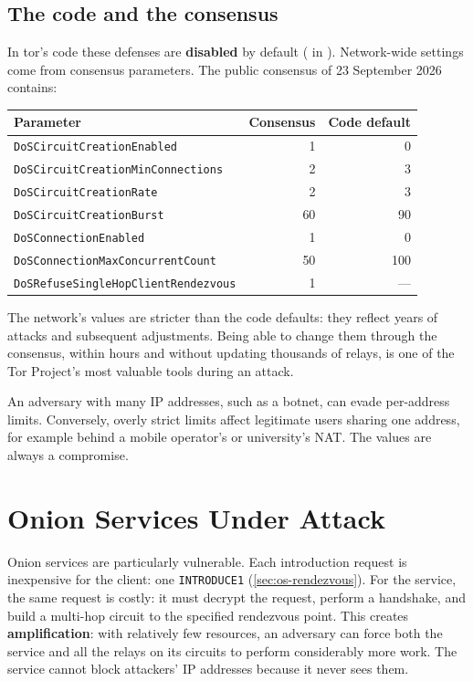 \subsection{The code and the consensus}

In tor's code these defenses are \textbf{disabled} by default ( in ). Network-wide settings come from consensus parameters. The public consensus of 23 September 2026 contains:
\begin{center}\small
\begin{tabular}{lrr}
\toprule
Parameter & Consensus & Code default \\
\midrule
\texttt{DoSCircuitCreationEnabled} & 1 & 0 \\
\texttt{DoSCircuitCreationMinConnections} & 2 & 3 \\
\texttt{DoSCircuitCreationRate} & 2 & 3 \\
\texttt{DoSCircuitCreationBurst} & 60 & 90 \\
\texttt{DoSConnectionEnabled} & 1 & 0 \\
\texttt{DoSConnectionMaxConcurrentCount} & 50 & 100 \\
\texttt{DoSRefuseSingleHopClientRendezvous} & 1 & --- \\
\bottomrule
\end{tabular}
\end{center}
The network's values are stricter than the code defaults: they reflect years of attacks and subsequent adjustments. Being able to change them through the consensus, within hours and without updating thousands of relays, is one of the Tor Project's most valuable tools during an attack.

\begin{attenzione}
An adversary with many IP addresses, such as a botnet, can evade per-address limits. Conversely, overly strict limits affect legitimate users sharing one address, for example behind a mobile operator's or university's NAT. The values are always a compromise.
\end{attenzione}

\section{Onion Services Under Attack}\label{sec:dos-onion}

Onion services are particularly vulnerable. Each introduction request is inexpensive for the client: one \texttt{INTRODUCE1} (\cref{sec:os-rendezvous}). For the service, the same request is costly: it must decrypt the request, perform a handshake, and build a multi-hop circuit to the specified rendezvous point. This creates \textbf{amplification}: with relatively few resources, an adversary can force both the service and all the relays on its circuits to perform considerably more work. The service cannot block attackers' IP addresses because it never sees them.

